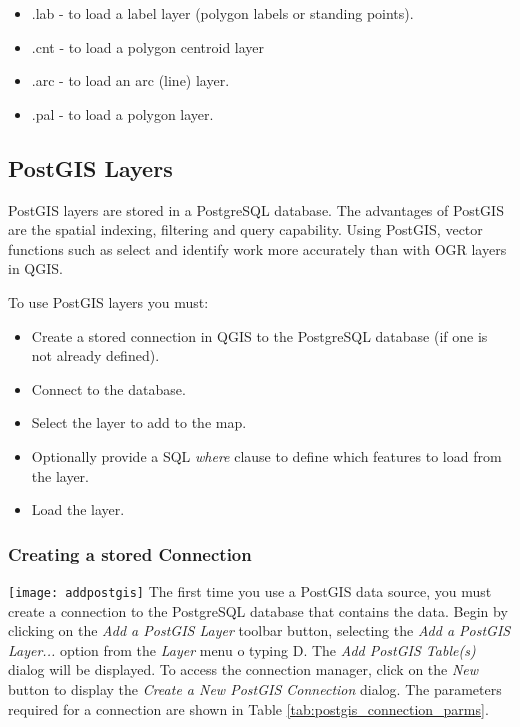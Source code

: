 \begin{itemize}
\item .lab - to load a label layer (polygon labels or standing points).
\item .cnt - to load a polygon centroid layer 
\item .arc - to load an arc (line) layer.
\item .pal - to load a polygon layer.
\end{itemize}

\subsection{PostGIS Layers}
\label{label_postgis} 

PostGIS layers are stored in a PostgreSQL database. The advantages of PostGIS
are the spatial indexing, filtering and query capability. Using PostGIS,
vector functions such as select and identify work more accurately than with
OGR layers in QGIS.

To use PostGIS layers you must:

\begin{itemize}
\item Create a stored connection in QGIS to the PostgreSQL database (if one is
not already defined).
\item Connect to the database.
\item Select the layer to add to the map.
\item Optionally provide a SQL \textit{where} clause to define which features
to load from the layer.
\item Load the layer.
\end{itemize}

\subsubsection{Creating a stored
Connection}\label{sec:postgis_stored}

\texttt{[image: addpostgis]} The first time
you use a PostGIS data source, you must create a connection to the PostgreSQL
database that contains the data. Begin by clicking on the \textit{Add a
PostGIS Layer} toolbar button, selecting the \textit{Add a
PostGIS Layer...} option from the \textit{Layer} menu o typing D. The \textsl{Add PostGIS Table(s)} dialog will
be displayed. To access the connection manager, click on the \textsl{New} button to display the \textsl{Create a New
PostGIS Connection} dialog. The parameters required for a connection are shown
in Table \ref{tab:postgis_connection_parms}.

